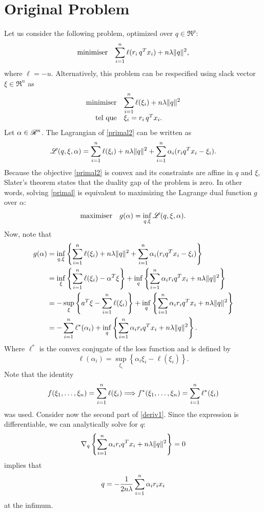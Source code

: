 \section{Original Problem}

Let us consider the following problem, optimized over $q \in \Re^p$:
\begin{equation}
  \label{primal}
  \begin{array}{ll}\mbox{minimiser} & \displaystyle{\sum_{i=1}^n\ell(r_i\,q^Tx_i) + n\lambda\|q\|^2,}\end{array}
\end{equation}
where $\ell=-u$. Alternatively, this problem can be respecified using slack vector
$\xi \in \Re^n$ as
\begin{equation}
  \minimizeEquationSt{\label{primal2}\sumi \ell(\xi_i) + n\lambda\|q\|^2}[\xi_i = r_i\,q^Tx_i.] 
\end{equation}
Let $\alpha\in\mathscr{R}^n$. The Lagrangian of \eqref{primal2} can be written as
\begin{equation}
  \mathscr{L}(q,\xi,\alpha) = \sum_{i=1}^n \ell(\xi_i) + n\lambda\|q\|^2 + \sum_{i=1}^n \alpha_i(r_iq^Tx_i - \xi_i).
\end{equation}
Because the objective \eqref{primal2} is convex and its constraints are affine in $q$ and
$\xi$, Slater's theorem states that the duality gap of the problem is zero. In other words,
solving \eqref{primal} is equivalent to maximizing the Lagrange dual function $g$ over
$\alpha$:
\begin{equation}
  \begin{array}{ll}\mbox{maximiser} & \displaystyle{g(\alpha) = \inf_{q,\xi} \mathscr{L}(q,\xi,\alpha).}\end{array}
\end{equation}
Now, note that
\begin{align}
  g(\alpha)
  &= \inf_{q,\xi} \left\{\sum_{i=1}^n \ell(\xi_i) + n\lambda\|q\|^2 + \sum_{i=1}^n \alpha_i(r_iq^Tx_i -
    \xi_i)\right\}\\
  &= \inf_\xi\left\{\sum_{i=1}^n \ell(\xi_i) - \alpha^T\xi\right\} + \inf_q\left\{\sum_{i=1}^n \alpha_ir_iq^Tx_i +
    n\lambda\|q\|^2\right\}\\
  & = -\sup_\xi\left\{a^T\xi - \sum_{i=1}^n \ell(\xi_i)\right\} + \inf_q\left\{\sum_{i=1}^n \alpha_ir_iq^Tx_i +
    n\lambda\|q\|^2\right\}\\
  & = -\sum_{i=1}^n \ell^*(\alpha_i) + \inf_q\left\{\sum_{i=1}^n \alpha_ir_iq^Tx_i +n\lambda\|q\|^2\right\}.\label{deriv1} 
\end{align}
Where $\ell^*$ is the convex conjugate of the loss function and is defined by
\begin{equation}
  \ell(\alpha_i) = \sup_{\xi_i}\left\{\alpha_i\xi_i - \ell(\xi_i)\right\}.
\end{equation}
Note that the identity
\begin{equation}
  \label{lemma1}
  f(\xi_1,\dots,\xi_n) = \sum_{i=1}^n \ell(\xi_i) \Longrightarrow f^*(\xi_1,\dots,\xi_n) = \sum_{i=1}^n \ell^*(\xi_i)
\end{equation}
was used. Consider now the second part of \eqref{deriv1}. Since
the expression is differentiable, we can analytically solve for $q$:
\begin{equation}
  \nabla_q \left\{\sum_{i=1}^n \alpha_ir_iq^Tx_i + n\lambda\|q\|^2\right\} = 0
\end{equation}
implies that
\begin{equation}
 q = -\frac{1}{2n\lambda}\sum_{i=1}^n \alpha_ir_ix_i \label{qdef}
\end{equation}
at the infimum.

